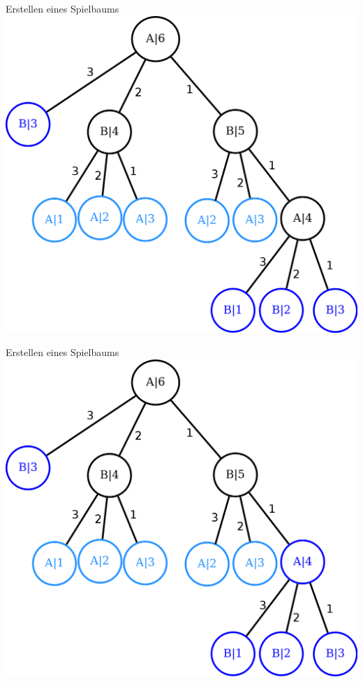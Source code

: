 \documentclass[18pt]{beamer}
\begin{document}
\begin{frame}{Erstellen eines Spielbaums}
\includegraphics[scale=0.4]{baum14.png}
\end{frame}

\begin{frame}{Erstellen eines Spielbaums}
\includegraphics[scale=0.4]{baum15.png}
\end{frame}
\end{document}

